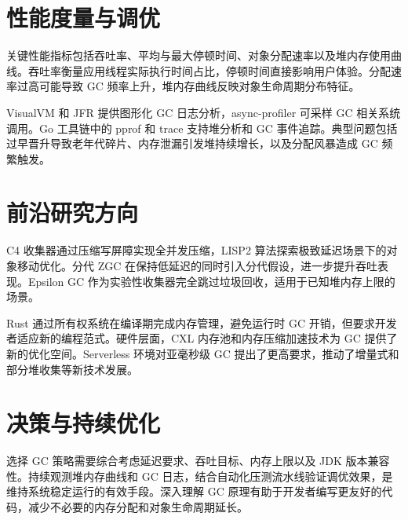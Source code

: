 \chapter{性能度量与调优}
关键性能指标包括吞吐率、平均与最大停顿时间、对象分配速率以及堆内存使用曲线。吞吐率衡量应用线程实际执行时间占比，停顿时间直接影响用户体验。分配速率过高可能导致 GC 频率上升，堆内存曲线反映对象生命周期分布特征。\par
VisualVM 和 JFR 提供图形化 GC 日志分析，async-profiler 可采样 GC 相关系统调用。Go 工具链中的 pprof 和 trace 支持堆分析和 GC 事件追踪。典型问题包括过早晋升导致老年代碎片、内存泄漏引发堆持续增长，以及分配风暴造成 GC 频繁触发。\par
\chapter{前沿研究方向}
C4 收集器通过压缩写屏障实现全并发压缩，LISP2 算法探索极致延迟场景下的对象移动优化。分代 ZGC 在保持低延迟的同时引入分代假设，进一步提升吞吐表现。Epsilon GC 作为实验性收集器完全跳过垃圾回收，适用于已知堆内存上限的场景。\par
Rust 通过所有权系统在编译期完成内存管理，避免运行时 GC 开销，但要求开发者适应新的编程范式。硬件层面，CXL 内存池和内存压缩加速技术为 GC 提供了新的优化空间。Serverless 环境对亚毫秒级 GC 提出了更高要求，推动了增量式和部分堆收集等新技术发展。\par
\chapter{决策与持续优化}
选择 GC 策略需要综合考虑延迟要求、吞吐目标、内存上限以及 JDK 版本兼容性。持续观测堆内存曲线和 GC 日志，结合自动化压测流水线验证调优效果，是维持系统稳定运行的有效手段。深入理解 GC 原理有助于开发者编写更友好的代码，减少不必要的内存分配和对象生命周期延长。\par
